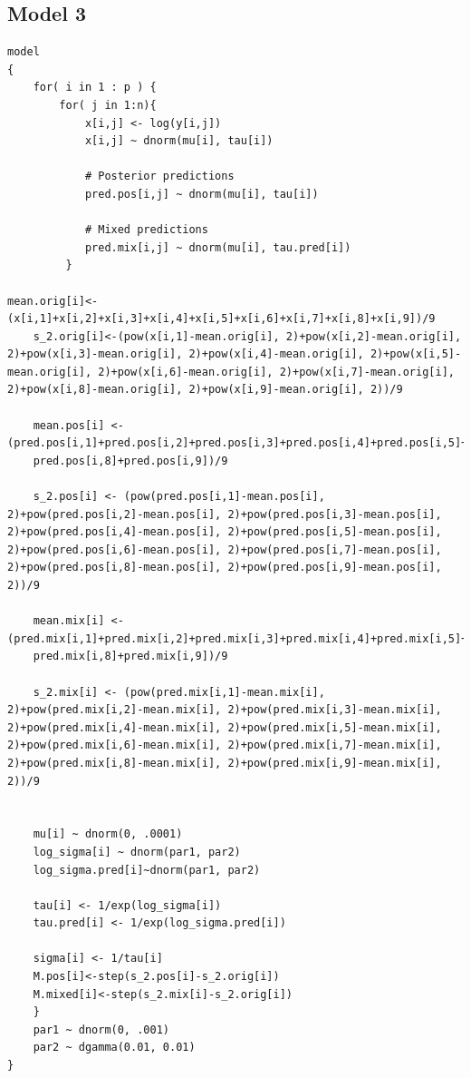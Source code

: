 \documentclass{article}
\begin{document}
\subsection*{Model 3}
\begin{lstlisting}
model
{
	for( i in 1 : p ) {
		for( j in 1:n){
			x[i,j] <- log(y[i,j])
			x[i,j] ~ dnorm(mu[i], tau[i])
			
			# Posterior predictions
			pred.pos[i,j] ~ dnorm(mu[i], tau[i])
			
			# Mixed predictions
			pred.mix[i,j] ~ dnorm(mu[i], tau.pred[i])
    	 }

mean.orig[i]<- (x[i,1]+x[i,2]+x[i,3]+x[i,4]+x[i,5]+x[i,6]+x[i,7]+x[i,8]+x[i,9])/9
	s_2.orig[i]<-(pow(x[i,1]-mean.orig[i], 2)+pow(x[i,2]-mean.orig[i], 2)+pow(x[i,3]-mean.orig[i], 2)+pow(x[i,4]-mean.orig[i], 2)+pow(x[i,5]-mean.orig[i], 2)+pow(x[i,6]-mean.orig[i], 2)+pow(x[i,7]-mean.orig[i], 2)+pow(x[i,8]-mean.orig[i], 2)+pow(x[i,9]-mean.orig[i], 2))/9
	
	mean.pos[i] <- (pred.pos[i,1]+pred.pos[i,2]+pred.pos[i,3]+pred.pos[i,4]+pred.pos[i,5]+pred.pos[i,6]+pred.pos[i,7]+
	pred.pos[i,8]+pred.pos[i,9])/9
	
	s_2.pos[i] <- (pow(pred.pos[i,1]-mean.pos[i], 2)+pow(pred.pos[i,2]-mean.pos[i], 2)+pow(pred.pos[i,3]-mean.pos[i], 2)+pow(pred.pos[i,4]-mean.pos[i], 2)+pow(pred.pos[i,5]-mean.pos[i], 2)+pow(pred.pos[i,6]-mean.pos[i], 2)+pow(pred.pos[i,7]-mean.pos[i], 2)+pow(pred.pos[i,8]-mean.pos[i], 2)+pow(pred.pos[i,9]-mean.pos[i], 2))/9
	
	mean.mix[i] <- (pred.mix[i,1]+pred.mix[i,2]+pred.mix[i,3]+pred.mix[i,4]+pred.mix[i,5]+pred.mix[i,6]+pred.mix[i,7]+
	pred.mix[i,8]+pred.mix[i,9])/9
	
	s_2.mix[i] <- (pow(pred.mix[i,1]-mean.mix[i], 2)+pow(pred.mix[i,2]-mean.mix[i], 2)+pow(pred.mix[i,3]-mean.mix[i], 2)+pow(pred.mix[i,4]-mean.mix[i], 2)+pow(pred.mix[i,5]-mean.mix[i], 2)+pow(pred.mix[i,6]-mean.mix[i], 2)+pow(pred.mix[i,7]-mean.mix[i], 2)+pow(pred.mix[i,8]-mean.mix[i], 2)+pow(pred.mix[i,9]-mean.mix[i], 2))/9
	
	
	mu[i] ~ dnorm(0, .0001)
	log_sigma[i] ~ dnorm(par1, par2)
	log_sigma.pred[i]~dnorm(par1, par2)
	
	tau[i] <- 1/exp(log_sigma[i])
	tau.pred[i] <- 1/exp(log_sigma.pred[i])
	
	sigma[i] <- 1/tau[i]
	M.pos[i]<-step(s_2.pos[i]-s_2.orig[i])
	M.mixed[i]<-step(s_2.mix[i]-s_2.orig[i])
	}
	par1 ~ dnorm(0, .001)
	par2 ~ dgamma(0.01, 0.01)
}
\end{lstlisting}
\end{document}
